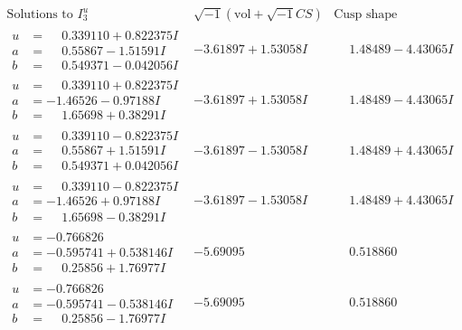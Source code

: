 \documentclass[1p]{elsarticle_modified}
\theoremstyle{definition}
\newcommand{\I}{\sqrt{-1}}
\begin{document}
$$\begin{array}{c|c|c}  
\text{Solutions to }I^u_{3}& \I (\text{vol} + \sqrt{-1}CS) & \text{Cusp shape}\\
 \hline 
\begin{aligned}
u &= \phantom{-}0.339110 + 0.822375 I \\
a &= \phantom{-}0.55867 - 1.51591 I \\
b &= \phantom{-}0.549371 - 0.042056 I\end{aligned}
 & -3.61897 + 1.53058 I & \phantom{-}1.48489 - 4.43065 I \\ \hline\begin{aligned}
u &= \phantom{-}0.339110 + 0.822375 I \\
a &= -1.46526 - 0.97188 I \\
b &= \phantom{-}1.65698 + 0.38291 I\end{aligned}
 & -3.61897 + 1.53058 I & \phantom{-}1.48489 - 4.43065 I \\ \hline\begin{aligned}
u &= \phantom{-}0.339110 - 0.822375 I \\
a &= \phantom{-}0.55867 + 1.51591 I \\
b &= \phantom{-}0.549371 + 0.042056 I\end{aligned}
 & -3.61897 - 1.53058 I & \phantom{-}1.48489 + 4.43065 I \\ \hline\begin{aligned}
u &= \phantom{-}0.339110 - 0.822375 I \\
a &= -1.46526 + 0.97188 I \\
b &= \phantom{-}1.65698 - 0.38291 I\end{aligned}
 & -3.61897 - 1.53058 I & \phantom{-}1.48489 + 4.43065 I \\ \hline\begin{aligned}
u &= -0.766826\phantom{ +0.000000I} \\
a &= -0.595741 + 0.538146 I \\
b &= \phantom{-}0.25856 + 1.76977 I\end{aligned}
 & -5.69095\phantom{ +0.000000I} & \phantom{-}0.518860\phantom{ +0.000000I} \\ \hline\begin{aligned}
u &= -0.766826\phantom{ +0.000000I} \\
a &= -0.595741 - 0.538146 I \\
b &= \phantom{-}0.25856 - 1.76977 I\end{aligned}
 & -5.69095\phantom{ +0.000000I} & \phantom{-}0.518860\phantom{ +0.000000I} \\ \hline\begin{aligned}

\end{aligned}
\end{array}$$
\end{document}

